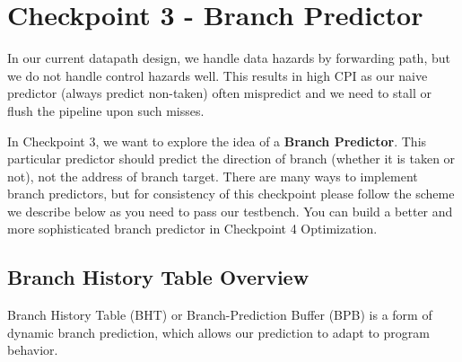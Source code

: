 \documentclass[11pt]{article}
\begin{document}




\section{Checkpoint 3 - Branch Predictor}
In our current datapath design, we handle data hazards by forwarding path, but we do not handle control hazards well. This results in high CPI as our naive predictor (always predict non-taken) often mispredict and we need to stall or flush the pipeline upon such misses. 

In Checkpoint 3, we want to explore the idea of a \textbf{Branch Predictor}. This particular predictor should predict the direction of branch (whether it is taken or not), not the address of branch target. There are many ways to implement branch predictors, but for consistency of this checkpoint please follow the scheme we describe below as you need to pass our testbench. You can build a better and more sophisticated branch predictor in Checkpoint 4 Optimization. 

\subsection{Branch History Table Overview}
Branch History Table (BHT) or Branch-Prediction Buffer (BPB) is a form of dynamic branch prediction, which allows our prediction to adapt to program behavior.  
\end{document}
